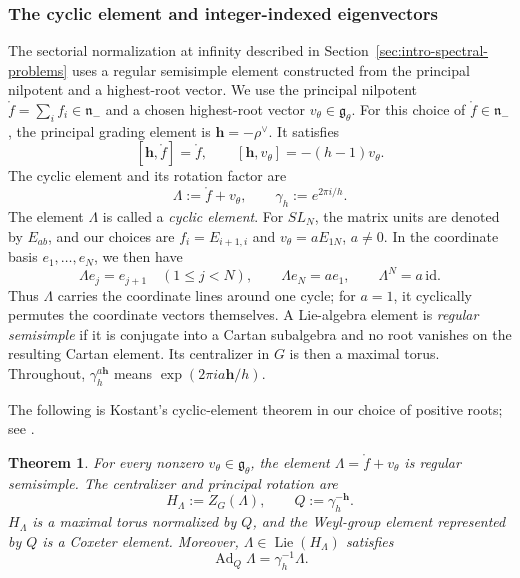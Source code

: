 \documentclass[11pt,leqno]{amsart}
\numberwithin{equation}{section}
\theoremstyle{plain}
\newtheorem{theorem}{Theorem}[section]
\theoremstyle{definition}
\theoremstyle{plain}
\theoremstyle{definition}
\theoremstyle{remark}
\newcommand{\g}{\mathfrak g}
\newcommand{\n}{\mathfrak n}
\begin{document}
\subsubsection{The cyclic element and integer-indexed eigenvectors}
The sectorial normalization at infinity described in Section~\ref{sec:intro-spectral-problems} uses a regular semisimple element constructed from the principal nilpotent and a highest-root vector.  We use the principal nilpotent $\mathring f=\sum_i f_i\in\n_-$ and a chosen highest-root vector $v_\theta\in\g_\theta$.  For this choice of $\mathring f\in\n_-$, the principal grading element is $\mathbf h=-\rho^\vee$.  It satisfies
\begin{equation}\label{eq:principal-grading-relations}
 [\mathbf h,\mathring f]=\mathring f,
 \qquad
 [\mathbf h,v_\theta]=-(h-1)v_\theta.
\end{equation}
The cyclic element and its rotation factor are
\begin{equation}\label{eq:Kostant-cyclic-element}
 \Lambda:=\mathring f+v_\theta,
 \qquad
 \gamma_h:=e^{2\pi i/h}.
\end{equation}
The element $\Lambda$ is called a \emph{cyclic element}.  For $SL_N$, the matrix units are denoted by $E_{ab}$, and our choices are $f_i=E_{i+1,i}$ and $v_\theta=aE_{1N}$, $a\ne0$.  In the coordinate basis $e_1,\ldots,e_N$, we then have
\[
 \Lambda e_j=e_{j+1}\quad(1\le j<N),\qquad
 \Lambda e_N=ae_1,\qquad \Lambda^N=a\,\mathrm{id}.
\]
Thus $\Lambda$ carries the coordinate lines around one cycle; for $a=1$, it cyclically permutes the coordinate vectors themselves.  A Lie-algebra element is \emph{regular semisimple} if it is conjugate into a Cartan subalgebra and no root vanishes on the resulting Cartan element.  Its centralizer in $G$ is then a maximal torus.  Throughout, $\gamma_h^{a\mathbf h}$ means $\exp(2\pi ia\mathbf h/h)$.

The following is Kostant's cyclic-element theorem in our choice of positive roots; see \cite[Lemma~6.3, Corollary~6.4, Section~6.7 and Corollary~8.6]{Kostant1959}.
\begin{theorem}\label{thm:Kostant-cyclic-Cartan}
For every nonzero $v_\theta\in\g_\theta$, the element $\Lambda=\mathring f+v_\theta$ is regular semisimple.  The centralizer and principal rotation are
\[
 H_\Lambda:=Z_G(\Lambda),\qquad Q:=\gamma_h^{-\mathbf h}.
\]
$H_\Lambda$ is a maximal torus normalized by $Q$, and the Weyl-group element represented by $Q$ is a Coxeter element.  Moreover, $\Lambda\in\operatorname{Lie}(H_\Lambda)$ satisfies
\[
 \operatorname{Ad}_Q\Lambda=\gamma_h^{-1}\Lambda.
\]
\end{theorem}
\end{document}
